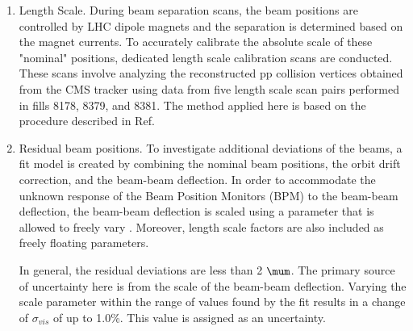 \begin{enumerate}
\item Length Scale. 
During beam separation scans, the beam positions are controlled by LHC dipole magnets and the separation is determined based on the magnet currents. To accurately calibrate the absolute scale of these "nominal" positions, dedicated length scale calibration scans are conducted. These scans involve analyzing the reconstructed pp collision vertices obtained from the CMS tracker using data from five length scale scan pairs performed in fills 8178, 8379, and 8381. The method applied here is based on the procedure described in Ref. \cite{lumi_precise_2015_2016}  

\item Residual beam positions. To investigate additional deviations of the beams, a fit model is created by combining the nominal beam positions, the orbit drift correction, and the beam-beam deflection. In order to accommodate the unknown response of the Beam Position Monitors (BPM) to the beam-beam deflection, the beam-beam deflection is scaled using a parameter that is allowed to freely vary \cite{lumi_precise_2015_2016}. Moreover, length scale factors are also included as freely floating parameters. 

In general, the residual deviations are less than 2 $\mum$. The primary source of uncertainty here is from the scale of the beam-beam deflection. Varying the scale parameter within the range of values found by the fit results in a change of $\sigma_{vis}$ of up to 1.0\%. This value is assigned as an uncertainty.\\




\end{enumerate}
